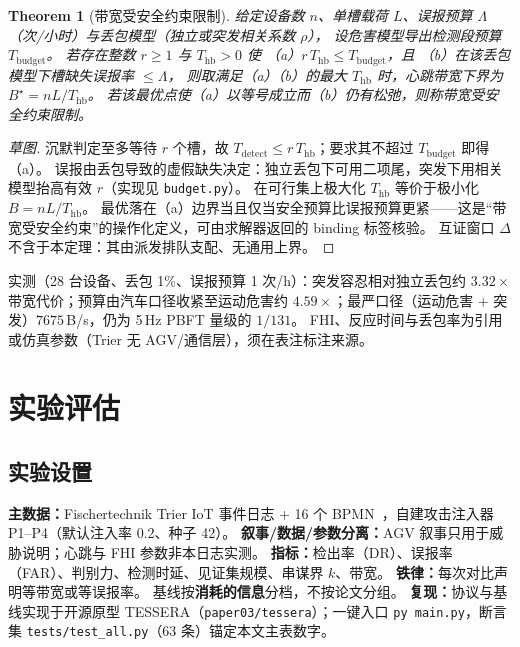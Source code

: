 \documentclass[manuscript,screen,review]{acmart}
\newtheorem{theorem}{Theorem}
\begin{document}
\begin{theorem}[带宽受安全约束限制]
\label{thm:bw}
给定设备数 $n$、单槽载荷 $L$、误报预算 $\Lambda$（次/小时）与丢包模型（独立或突发相关系数 $\rho$），
设危害模型导出检测段预算 $T_{\mathrm{budget}}$。
若存在整数 $r\ge 1$ 与 $T_{\mathrm{hb}}>0$ 使
（a）$r\,T_{\mathrm{hb}}\le T_{\mathrm{budget}}$，且
（b）在该丢包模型下槽缺失误报率 $\le\Lambda$，
则取满足（a）（b）的最大 $T_{\mathrm{hb}}$ 时，心跳带宽下界为 $B^\star=n L/T_{\mathrm{hb}}$。
若该最优点使（a）以等号成立而（b）仍有松弛，则称带宽受安全约束限制。
\end{theorem}
\begin{proof}[草图]
沉默判定至多等待 $r$ 个槽，故 $T_{\mathrm{detect}}\le r\,T_{\mathrm{hb}}$；要求其不超过 $T_{\mathrm{budget}}$ 即得（a）。
误报由丢包导致的虚假缺失决定：独立丢包下可用二项尾，突发下用相关模型抬高有效 $r$（实现见 \texttt{budget.py}）。
在可行集上极大化 $T_{\mathrm{hb}}$ 等价于极小化 $B=nL/T_{\mathrm{hb}}$。
最优落在（a）边界当且仅当安全预算比误报预算更紧——这是``带宽受安全约束''的操作化定义，可由求解器返回的 binding 标签核验。
互证窗口 $\Delta$ 不含于本定理：其由派发排队支配、无通用上界。
\end{proof}

实测（28 台设备、丢包 1\%、误报预算 1 次/h）：突发容忍相对独立丢包约 $3.32\times$ 带宽代价；预算由汽车口径收紧至运动危害约 $4.59\times$；最严口径（运动危害 + 突发）$7675$\,B/s，仍为 5\,Hz PBFT 量级的 $1/131$。
FHI、反应时间与丢包率为引用或仿真参数（Trier 无 AGV/通信层），须在表注标注来源。

\section{实验评估}
\label{sec:eval}

\subsection{实验设置}
\label{sec:setup}

\textbf{主数据：}Fischertechnik Trier IoT 事件日志 + 16 个 BPMN~\cite{trier2022}，自建攻击注入器 P1--P4（默认注入率 0.2、种子 42）。
\textbf{叙事/数据/参数分离：}AGV 叙事只用于威胁说明；心跳与 FHI 参数非本日志实测。
\textbf{指标：}检出率（DR）、误报率（FAR）、判别力、检测时延、见证集规模、串谋界 $k$、带宽。
\textbf{铁律：}每次对比声明等带宽或等误报率。
基线按\textbf{消耗的信息}分档，不按论文分组。
\textbf{复现：}协议与基线实现于开源原型 TESSERA（\texttt{paper03/tessera}）；一键入口 \texttt{py main.py}，断言集 \texttt{tests/test\_all.py}（63 条）锚定本文主表数字。
\end{document}
